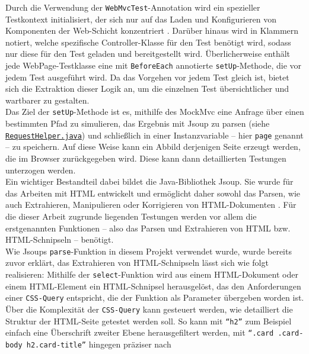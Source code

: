 Durch die Verwendung der \texttt{WebMvcTest}-Annotation wird ein spezieller 
Testkontext initialisiert, der sich nur auf das Laden und Konfigurieren von 
Komponenten der Web-Schicht konzentriert \cite{vmware2024webmvctest}. 
Darüber hinaus wird in Klammern notiert, welche spezifische Controller-Klasse für 
den Test benötigt wird, sodass nur diese für den Test geladen und bereitgestellt 
wird. Überlicherweise enthält jede WebPage-Testklasse eine mit \texttt{BeforeEach} 
annotierte \texttt{setUp}-Methode, die vor jedem Test ausgeführt wird. Da das 
Vorgehen vor jedem Test gleich ist, bietet sich die Extraktion dieser Logik an, 
um die einzelnen Test übersichtlicher und wartbarer zu gestalten. \\ 
Das Ziel der \texttt{setUp}-Methode ist es, mithilfe des MockMvc eine Anfrage über 
einen bestimmten Pfad zu simulieren, das Ergebnis mit Jsoup zu parsen (siehe 
\href{https://github.com/FlorianOhmes/bat_spielzeitenplaner/blob/main/spielzeitenplaner/src/test/java/de/bathesis/spielzeitenplaner/utilities/RequestHelper.java}{\texttt{RequestHelper.java}}) und schließlich in einer 
Instanzvariable -- hier \texttt{page} genannt -- zu speichern. Auf diese Weise kann 
ein Abbild derjenigen Seite erzeugt werden, die im Browser zurückgegeben wird. 
Diese kann dann detaillierten Testungen unterzogen werden. \\ 
Ein wichtiger Bestandteil dabei bildet die Java-Bibliothek Jsoup. Sie wurde für das 
Arbeiten mit HTML entwickelt und ermöglicht daher sowohl das Parsen, wie auch 
Extrahieren, Manipulieren oder Korrigieren von HTML-Dokumenten 
\cite{hedley2024jsoup}. Für die dieser Arbeit zugrunde liegenden 
Testungen werden vor allem die erstgenannten Funktionen -- also das Parsen und 
Extrahieren von HTML bzw. HTML-Schnipseln -- benötigt. \\ 
Wie Jsoups \texttt{parse}-Funktion in diesem Projekt verwendet wurde, wurde bereits 
zuvor erklärt, das Extrahieren von HTML-Schnipseln lässt sich wie folgt 
realisieren: Mithilfe der \texttt{select}-Funktion wird aus einem HTML-Dokument 
oder einem HTML-Element ein HTML-Schnipsel herausgelöst, das den Anforderungen 
einer \texttt{CSS-Query} entspricht, die der Funktion als Parameter übergeben 
worden ist. \\ 
Über die Komplexität der \texttt{CSS-Query} kann gesteuert werden, wie 
detailliert die Struktur der HTML-Seite getestet werden soll. So kann mit 
\texttt{``h2''} zum Beispiel einfach eine Überschrift zweiter Ebene herausgefiltert 
werden, mit \texttt{``.card .card-body h2.card-title''} hingegen präziser nach 
